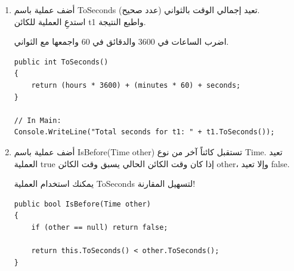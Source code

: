 \documentclass[14pt]{extarticle}
\begin{document}
\begin{enumerate}[itemsep=2em]
\begin{boxSolution}
\begin{english}
\begin{verbatim}
// In Main:
t1.Print();
t2.Print();
    \end{verbatim}
    \end{english}
    \end{boxSolution}
    \clearpage
    \fi

    \item
    أضف عملية باسم \textenglish{ToSeconds} تعيد إجمالي الوقت بالثواني (عدد صحيح). \\
    استدعِ العملية للكائن \textenglish{t1} واطبع النتيجة.
    \begin{boxHint}
    اضرب الساعات في 3600 والدقائق في 60 واجمعها مع الثواني.
    \end{boxHint}

    \ifwithsols
    \begin{boxSolution}
    \begin{english}
    \begin{verbatim}
public int ToSeconds()
{
    return (hours * 3600) + (minutes * 60) + seconds;
}

// In Main:
Console.WriteLine("Total seconds for t1: " + t1.ToSeconds());
    \end{verbatim}
    \end{english}
    \end{boxSolution}
    \clearpage
    \fi

    \item
    أضف عملية باسم \textenglish{IsBefore(Time other)} تستقبل كائناً آخر من نوع \textenglish{Time}.
    تعيد العملية \textenglish{true} إذا كان وقت الكائن الحالي يسبق وقت الكائن \textenglish{other}، وإلا تعيد \textenglish{false}.
    \begin{boxHint}
    يمكنك استخدام العملية \textenglish{ToSeconds} لتسهيل المقارنة!
    \end{boxHint}

    \ifwithsols
    \begin{boxSolution}
    \begin{english}
    \begin{verbatim}
public bool IsBefore(Time other)
{
    if (other == null) return false;

    return this.ToSeconds() < other.ToSeconds();
}


\end{verbatim}
\end{english}
\end{boxSolution}
\end{enumerate}
\end{document}
